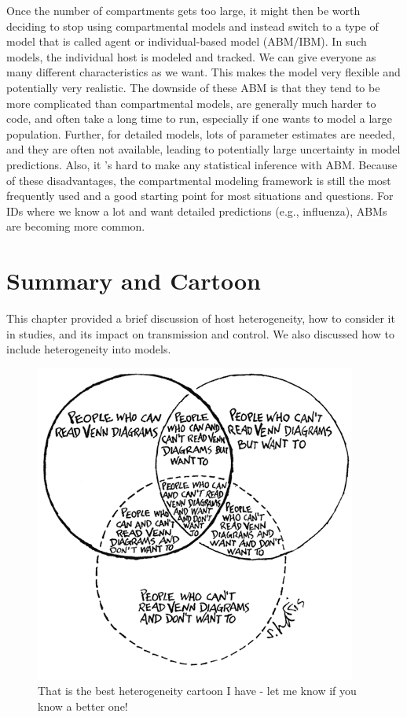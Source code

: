 \documentclass[]{book}
\theoremstyle{definition}
\theoremstyle{definition}
\theoremstyle{definition}
\theoremstyle{remark}
\begin{document}
Once the number of compartments gets too large, it might then be worth
deciding to stop using compartmental models and instead switch to a type
of model that is called agent or individual-based model (ABM/IBM). In
such models, the individual host is modeled and tracked. We can give
everyone as many different characteristics as we want. This makes the
model very flexible and potentially very realistic. The downside of
these ABM is that they tend to be more complicated than compartmental
models, are generally much harder to code, and often take a long time to
run, especially if one wants to model a large population. Further, for
detailed models, lots of parameter estimates are needed, and they are
often not available, leading to potentially large uncertainty in model
predictions. Also, it 's hard to make any statistical inference with
ABM. Because of these disadvantages, the compartmental modeling
framework is still the most frequently used and a good starting point
for most situations and questions. For IDs where we know a lot and want
detailed predictions (e.g., influenza), ABMs are becoming more common.

\section{Summary and Cartoon}\label{summary-and-cartoon-10}

This chapter provided a brief discussion of host heterogeneity, how to
consider it in studies, and its impact on transmission and control. We
also discussed how to include heterogeneity into models.

\begin{figure}
\centering
\includegraphics{./images/crazyvenndiagram.png}
\caption{\label{fig:crazyvenndiagram}That is the best heterogeneity cartoon
I have - let me know if you know a better one!}
\end{figure}
\end{document}
